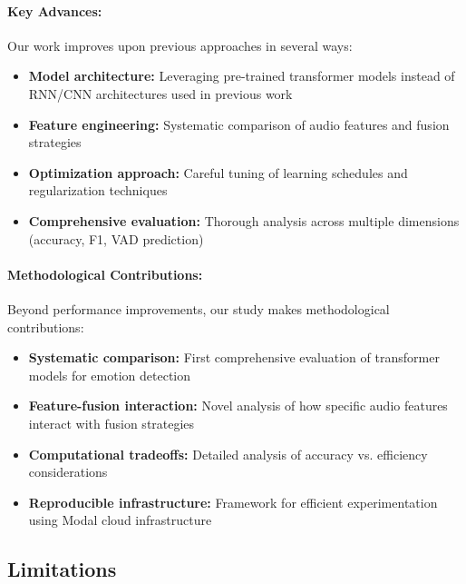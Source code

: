\documentclass[12pt]{article}
\begin{document}
\paragraph{Key Advances:}
Our work improves upon previous approaches in several ways:

\begin{itemize}
    \item \textbf{Model architecture:} Leveraging pre-trained transformer models instead of RNN/CNN architectures used in previous work
    
    \item \textbf{Feature engineering:} Systematic comparison of audio features and fusion strategies
    
    \item \textbf{Optimization approach:} Careful tuning of learning schedules and regularization techniques
    
    \item \textbf{Comprehensive evaluation:} Thorough analysis across multiple dimensions (accuracy, F1, VAD prediction)
\end{itemize}

\paragraph{Methodological Contributions:}
Beyond performance improvements, our study makes methodological contributions:

\begin{itemize}
    \item \textbf{Systematic comparison:} First comprehensive evaluation of transformer models for emotion detection
    
    \item \textbf{Feature-fusion interaction:} Novel analysis of how specific audio features interact with fusion strategies
    
    \item \textbf{Computational tradeoffs:} Detailed analysis of accuracy vs. efficiency considerations
    
    \item \textbf{Reproducible infrastructure:} Framework for efficient experimentation using Modal cloud infrastructure
\end{itemize}

\subsection{Limitations}
\end{document}
